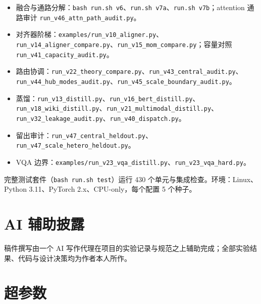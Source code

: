 \documentclass[10pt,twoside]{article}
\theoremstyle{definition}
\theoremstyle{plain}
\theoremstyle{remark}
\begin{document}
\begin{itemize}[leftmargin=1.6em, itemsep=0.5pt, parsep=0pt]
    \item 融合与通路分解：\texttt{bash run.sh v6}、\texttt{run.sh v7a}、\texttt{run.sh v7b}；attention 通路审计 \texttt{run\_v46\_attn\_path\_audit.py}。
    \item 对齐器阶梯：\texttt{examples/run\_v10\_aligner.py}、\texttt{run\_v14\_aligner\_compare.py}、\texttt{run\_v15\_mom\_compare.py}；容量对照 \texttt{run\_v41\_capacity\_audit.py}。
    \item 路由协调：\texttt{run\_v22\_theory\_compare.py}、\texttt{run\_v43\_central\_audit.py}、\texttt{run\_v44\_hub\_modes\_audit.py}、\texttt{run\_v45\_scale\_boundary\_audit.py}。
    \item 蒸馏：\texttt{run\_v13\_distill.py}、\texttt{run\_v16\_bert\_distill.py}、\texttt{run\_v18\_wiki\_distill.py}、\texttt{run\_v21\_multimodal\_distill.py}、\texttt{run\_v32\_leakage\_audit.py}、\texttt{run\_v40\_dispatch.py}。
    \item 留出审计：\texttt{run\_v47\_central\_heldout.py}、\texttt{run\_v47\_scale\_hetero\_heldout.py}。
    \item VQA 边界：\texttt{examples/run\_v23\_vqa\_distill.py}、\texttt{run\_v23\_vqa\_hard.py}。
\end{itemize}

完整测试套件（\texttt{bash run.sh test}）运行 430 个单元与集成检查。环境：Linux、Python 3.11、PyTorch 2.x、CPU-only，每个配置 5 个种子。

\section*{AI 辅助披露}

稿件撰写由一个 AI 写作代理在项目的实验记录与规范之上辅助完成；全部实验结果、代码与设计决策均为作者本人所作。




\appendix

\clearpage

\section{超参数}
\label{app:hyper}
\end{document}
